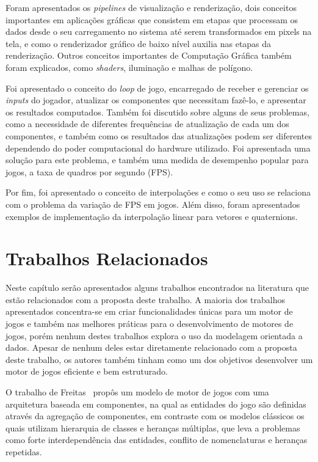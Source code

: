 Foram apresentados os \textit{pipelines} de visualização e renderização, dois 
conceitos importantes em aplicações gráficas que consistem em etapas que processam os 
dados desde o seu carregamento no sistema até serem transformados em pixels na tela, 
e como o renderizador gráfico de baixo nível auxilia nas etapas da renderização.
Outros conceitos importantes de Computação Gráfica também foram explicados, como 
\textit{shaders}, iluminação e malhas de polígono.

Foi apresentado o conceito do \textit{loop} de jogo,
encarregado de receber e gerenciar os \textit{inputs} do jogador, atualizar os 
componentes que necessitam fazê-lo, e apresentar os resultados computados.
Também foi discutido sobre alguns de seus problemas, como a necessidade de diferentes 
frequências de atualização de cada um dos componentes, e também como os resultados 
das atualizações podem ser diferentes dependendo do poder computacional do hardware 
utilizado. Foi apresentada uma solução para este problema, e também uma medida de 
desempenho popular para jogos, a taxa de quadros por segundo (FPS).

Por fim, foi apresentado o conceito de interpolações e como o seu uso se relaciona com 
o problema da variação de FPS em jogos. Além disso, foram apresentados exemplos de 
implementação da interpolação linear para vetores e quaternions.

\chapter{Trabalhos Relacionados}
\label{relatedworkscap}

Neste capítulo serão apresentados alguns trabalhos encontrados na literatura que estão relacionados 
com a proposta deste trabalho. A maioria dos trabalhos apresentados concentra-se em criar 
funcionalidades únicas para um motor de jogos e também nas melhores práticas para o 
desenvolvimento de motores de jogos, porém nenhum destes trabalhos explora o uso da 
modelagem orientada a dados.
Apesar de nenhum deles estar diretamente relacionado com a proposta deste trabalho, os 
autores também tinham como um dos objetivos desenvolver um motor de jogos eficiente e 
bem estruturado.

O trabalho de Freitas~\cite{deFreitas2012GEC} propôs um modelo de motor de jogos com uma 
arquitetura baseada em componentes, na qual as entidades do jogo são definidas através 
da agregação de componentes, em contraste com os modelos clássicos os quais utilizam 
hierarquia de classes e heranças múltiplas, que leva a problemas como forte 
interdependência das entidades, conflito de nomenclaturas e heranças repetidas.


